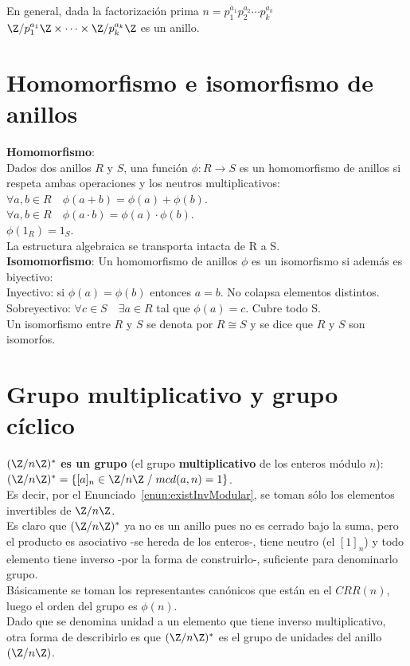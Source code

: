 En general, dada la factorización prima $n = p_1^{a_1} p_2^{a_2} \cdots p_k^{a_k}$ \\
$\Z/p_1^{a_1}\Z \times \dots \times \Z/p_k^{a_k}\Z$ es un anillo.

\section{Homomorfismo e isomorfismo de anillos}
\textbf{Homomorfismo}: \\
Dados dos anillos $R$ y $S$, una función $\phi: R \to S$ es un homomorfismo de anillos si respeta ambas operaciones y los neutros multiplicativos: \\
$\forall a, b \in R \quad \phi (a + b) = \phi(a) + \phi(b)$. \\
$\forall a, b \in R \quad \phi (a \cdot b) = \phi (a) \cdot \phi (b)$. \\
$\phi (1_R) = 1_S$. \\
La estructura algebraica se transporta intacta de R a S.\\

\textbf{Isomomorfismo}:
Un homomorfismo de anillos $\phi$ es un isomorfismo si además es biyectivo: \\
Inyectivo: si $\phi (a) = \phi (b)$ entonces $a = b$. No colapsa elementos distintos. \\
Sobreyectivo: $\forall c \in S \quad \exists a \in R$ tal que $\phi (a) = c$. Cubre todo S. \\
Un isomorfismo entre $R$ y $S$ se denota por $R \cong S$ y se dice que $R$ y $S$ son isomorfos.


\section{Grupo multiplicativo y grupo cíclico}
$(\Z/n\Z)^{*}$ \textbf{es un grupo} (el grupo \textbf{multiplicativo} de los enteros módulo $n$): \\
$(\Z/n\Z)^{*} = \{ [a]_n \in \Z/n\Z \;/\; mcd(a,n) = 1\}$.  \\
Es decir, por el Enunciado~\ref{enun:existInvModular}, se toman sólo los elementos invertibles de $\Z/n\Z$. \\
Es claro que $(\Z/n\Z)^{*}$ ya no es un anillo pues no es cerrado bajo la suma, pero el producto es asociativo -se hereda de los enteros-, tiene neutro (el $[1]_n$) y todo elemento tiene inverso -por la forma de construirlo-, suficiente para denominarlo grupo. \\
Básicamente se toman los representantes canónicos que están en el $CRR(n)$, luego el orden del grupo es $\phi (n)$.  \\
Dado que se denomina unidad a un elemento que tiene inverso multiplicativo, otra forma de describirlo es que $(\Z/n\Z)^{*}$ es el grupo de unidades del anillo $(\Z/n\Z)$. \\

